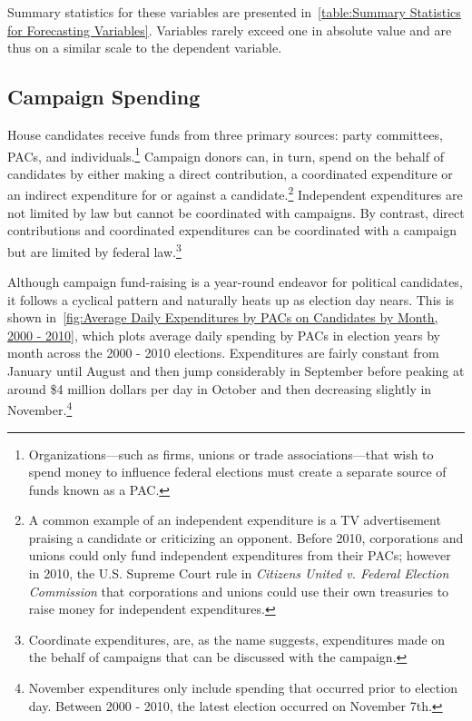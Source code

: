 \documentclass[12pt,final,fleqn]{article}
\theoremstyle{plain}
\begin{document}
Summary statistics for these variables are presented in~\autoref{table:Summary Statistics for Forecasting Variables}. Variables rarely exceed one in absolute value and are thus on a similar scale to the dependent variable.



\subsection{Campaign Spending} \label{sec: campaign spending}
House candidates receive funds from three primary sources: party committees, PACs, and individuals.\footnote{Organizations---such as firms, unions or trade associations---that wish to spend money to influence federal elections must create a separate source of funds known as a PAC.} Campaign donors can, in turn, spend on the behalf of candidates by either making a direct contribution, a coordinated expenditure or an indirect expenditure for or against a candidate.\footnote{A common example of an independent expenditure is a TV advertisement praising a candidate or criticizing an opponent. Before 2010, corporations and unions could only fund independent expenditures from their PACs; however in 2010, the U.S. Supreme Court rule in \emph{Citizens United v. Federal Election Commission} that corporations and unions could use their own treasuries to raise money for independent expenditures.} Independent expenditures are not limited by law but cannot be coordinated with campaigns. By contrast, direct contributions and coordinated expenditures can be coordinated with a campaign but are limited by federal law.\footnote{Coordinate expenditures, are, as the name suggests, expenditures made on the behalf of campaigns that can be discussed with the campaign.}

Although campaign fund-raising is a year-round endeavor for political candidates, it follows a cyclical pattern and naturally heats up as election day nears. This is shown in~\autoref{fig:Average Daily Expenditures by PACs on Candidates by Month, 2000 - 2010}, which plots average daily spending by PACs in election years by month across the 2000 - 2010 elections. Expenditures are fairly constant from January until August and then jump considerably in September before peaking at around \$4 million dollars per day in October and then decreasing slightly in November.\footnote{November expenditures only include spending that occurred prior to election day. Between 2000 - 2010, the latest election occurred on November 7th.} 
\end{document}
